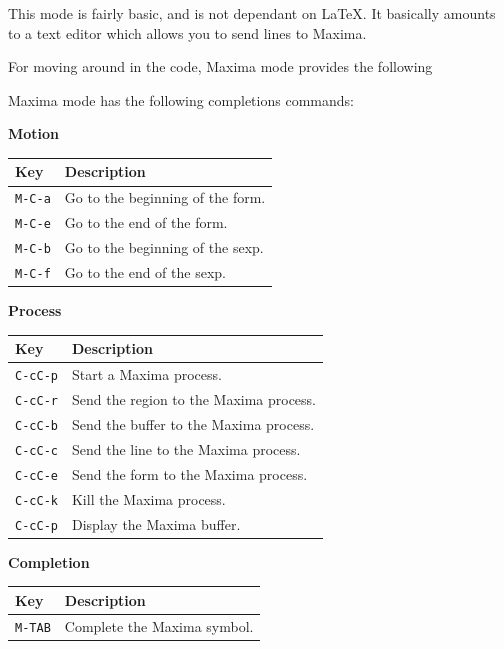 This mode is fairly basic, and is not dependant on LaTeX.  It basically amounts
to a text editor which allows you to send lines to Maxima.  

For moving around in the code, Maxima mode provides the following

\noindent
Maxima mode has the following completions commands:

\textbf{Motion}

\smallskip

\noindent
\begin{tabular}{p{\firstcol}p{\secondcol}}
\hline
\textbf{Key} & \textbf{Description}\\
\hline
\texttt{M-C-a} & Go to the beginning of the form.\\
\texttt{M-C-e} & Go to the end of the form.\\
\texttt{M-C-b} & Go to the beginning of the sexp.\\
\texttt{M-C-f} & Go to the end of the sexp.
\end{tabular}

\smallskip

\noindent
\textbf{Process}

\smallskip

\noindent
\begin{tabular}{p{\firstcol}p{\secondcol}}
\hline
\textbf{Key} & \textbf{Description}\\
\hline
\texttt{C-cC-p} & Start a Maxima process.\\
\texttt{C-cC-r} & Send the region to the Maxima process.\\
\texttt{C-cC-b} & Send the buffer to the Maxima process.\\
\texttt{C-cC-c} & Send the line to the Maxima process.\\
\texttt{C-cC-e} & Send the form to the Maxima process.\\
\texttt{C-cC-k} & Kill the Maxima process.\\
\texttt{C-cC-p} & Display the Maxima buffer.
\end{tabular}

\smallskip

\noindent
\textbf{Completion}

\smallskip

\noindent
\begin{tabular}{p{\firstcol}p{\secondcol}}
\hline
\textbf{Key} & \textbf{Description}\\
\hline
\texttt{M-TAB} & Complete the Maxima symbol.
\end{tabular}

